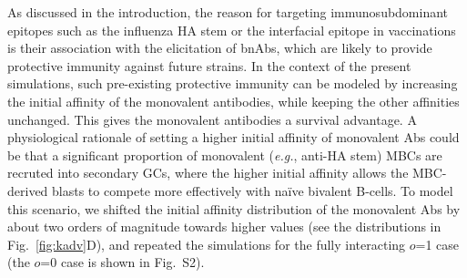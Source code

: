 \documentclass[utf8]{frontiersHLTH}%
\def\eg {{\it e.g.}}
\newcommand{\fig}[1]{Fig.~\ref{fig:#1}}
\newcommand{\occl}{o}
\begin{document}
As discussed in the introduction, the reason for targeting immunosubdominant
epitopes such as the influenza HA stem or the interfacial
epitope\cite{watanabe19} in vaccinations is their association with the elicitation of bnAbs, which
are likely to provide protective immunity against future strains.
In the context of the present simulations,
such pre-existing protective immunity
can be modeled by increasing the initial affinity of the monovalent
antibodies, while keeping the other affinities unchanged.  This gives the
monovalent antibodies a survival advantage. A physiological
rationale of setting a higher initial affinity of monovalent Abs could
be that a significant proportion of monovalent (\eg, anti-HA stem) MBCs are recruted into secondary
GCs, where the higher initial affinity allows the MBC-derived blasts to compete more effectively with na\"ive bivalent B-cells.
To model this scenario, we shifted the initial affinity distribution of the
monovalent Abs
by about two orders of magnitude towards higher values
(see the distributions in \fig{kadv}D), and repeated the simulations for the
fully interacting $\occl$=1 case (the $\occl$=0 case is shown in Fig.~S2).
\end{document}
